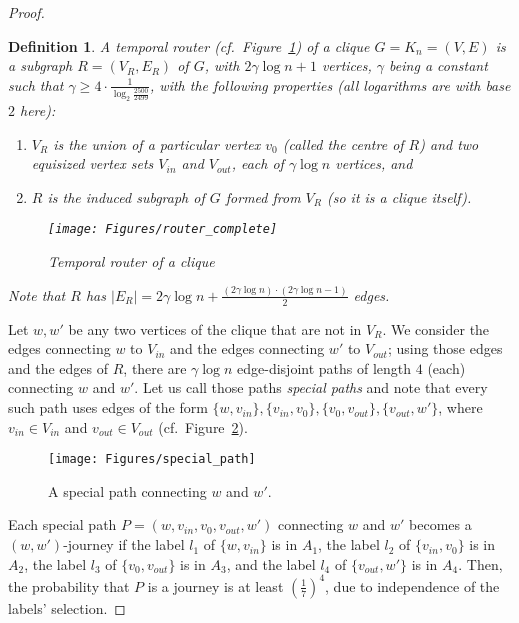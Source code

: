 \documentclass[a4paper,UKenglish]{article}
\newtheorem{definition}{Definition}
\begin{document}
\begin{proof}
\begin{definition}
A temporal router (cf.~Figure~\ref{fig:router_complete}) of a clique $G=K_n=(V,E)$ is a subgraph $R=(V_R,E_R)$ of $G$, with $2\gamma \log{n}+1$ vertices, $\gamma$ being a constant such that $\gamma \geq 4 \cdot \frac{1}{\log_2{\frac{2500}{2499}}}$, with the following properties (all logarithms are with base $2$ here):
\begin{enumerate}[label=\alph*)]
\item $V_R$ is the union of a particular vertex $v_0$ (called the \emph{centre} of $R$) and two equisized vertex sets $V_{in}$ and $V_{out}$, each of $\gamma \log{n}$ vertices, and
\item $R$ is the induced subgraph of $G$ formed from $V_R$ (so it is a clique itself).
\end{enumerate}
\begin{figure}[!htb]
\centering
\texttt{[image: Figures/router\_complete]}
\caption{Temporal router of a clique}
\label{fig:router_complete}
\end{figure}
Note that $R$ has $|E_R|=2 \gamma \log{n} + \frac{(2 \gamma \log{n})\cdot(2 \gamma \log{n}-1)}{2}$ edges.
\end{definition}

Let $w, w'$ be any two vertices of the clique that are not in $V_R$. We consider the edges connecting $w$ to $V_{in}$ and the edges connecting $w'$ to $V_{out}$; using those edges and the edges of $R$, there are $\gamma \log{n}$ edge-disjoint paths of length $4$ (each) connecting $w$ and $w'$. Let us call those paths \emph{special paths} and note that every such path uses edges of the form $\{w,v_{in}\}, \{v_{in}, v_0\}, \{v_0, v_{out}\}, \{v_{out}, w'\}$, where $v_{in} \in V_{in}$ and $v_{out} \in V_{out}$ (cf.~Figure~\ref{fig:special_path}).
\begin{figure}[!htb]
\centering
\texttt{[image: Figures/special\_path]}
\caption{A special path connecting $w$ and $w'$.}
\label{fig:special_path}
\end{figure}

Each special path $P=(w,v_{in},v_0,v_{out},w')$ connecting $w$ and $w'$ becomes a $(w,w')$-journey if the label $l_1$ of $\{w,v_{in}\}$ is in $A_1$, the label $l_2$ of $\{v_{in}, v_0\}$ is in $A_2$, the label $l_3$ of $\{v_0, v_{out}\}$ is in $A_3$, and the label $l_4$ of $\{v_{out}, w'\}$ is in $A_4$. Then, the probability that $P$ is a journey is at least $\left( \frac{1}{7} \right)^4$, due to independence of the labels' selection.


\end{proof}
\end{document}
